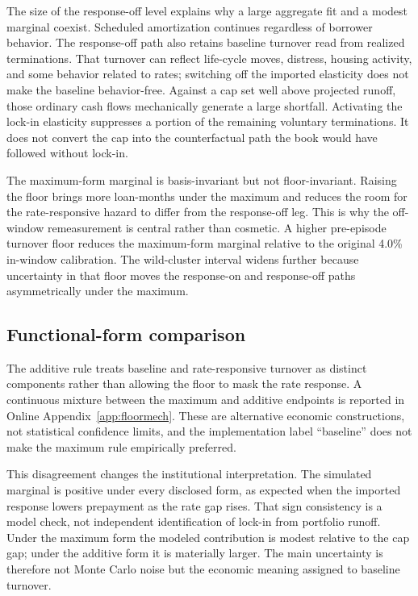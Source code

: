 The size of the response-off level explains why a large aggregate fit and a modest marginal coexist. Scheduled amortization continues regardless of borrower behavior. The response-off path also retains baseline turnover read from realized terminations. That turnover can reflect life-cycle moves, distress, housing activity, and some behavior related to rates; switching off the imported elasticity does not make the baseline behavior-free. Against a cap set well above projected runoff, those ordinary cash flows mechanically generate a large shortfall. Activating the lock-in elasticity suppresses a portion of the remaining voluntary terminations. It does not convert the cap into the counterfactual path the book would have followed without lock-in.

The maximum-form marginal is basis-invariant but not floor-invariant. Raising the floor brings more loan-months under the maximum and reduces the room for the rate-responsive hazard to differ from the response-off leg. This is why the off-window remeasurement is central rather than cosmetic. A higher pre-episode turnover floor reduces the maximum-form marginal relative to the original 4.0\% in-window calibration. The wild-cluster interval widens further because uncertainty in that floor moves the response-on and response-off paths asymmetrically under the maximum.

\subsection{Functional-form comparison}

The additive rule treats baseline and rate-responsive turnover as distinct components rather than allowing the floor to mask the rate response. A continuous mixture between the maximum and additive endpoints is reported in Online Appendix~\ref{app:floormech}. These are alternative economic constructions, not statistical confidence limits, and the implementation label ``baseline'' does not make the maximum rule empirically preferred.

This disagreement changes the institutional interpretation. The simulated marginal is positive under every disclosed form, as expected when the imported response lowers prepayment as the rate gap rises. That sign consistency is a model check, not independent identification of lock-in from portfolio runoff. Under the maximum form the modeled contribution is modest relative to the cap gap; under the additive form it is materially larger. The main uncertainty is therefore not Monte Carlo noise but the economic meaning assigned to baseline turnover.

